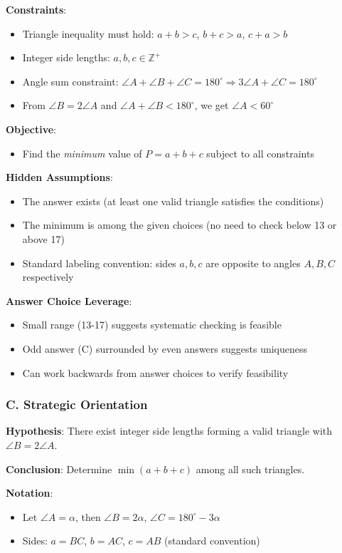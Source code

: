 \documentclass[12pt]{article}
\begin{document}
\begin{problemconfigbox}
\textbf{Constraints}:
\begin{itemize}
    \item Triangle inequality must hold: $a + b > c$, $b + c > a$, $c + a > b$
    \item Integer side lengths: $a, b, c \in \mathbb{Z}^+$
    \item Angle sum constraint: $\angle A + \angle B + \angle C = 180^\circ \Rightarrow 3\angle A + \angle C = 180^\circ$
    \item From $\angle B = 2\angle A$ and $\angle A + \angle B < 180^\circ$, we get $\angle A < 60^\circ$
\end{itemize}

\textbf{Objective}:
\begin{itemize}
    \item Find the \textit{minimum} value of $P = a + b + c$ subject to all constraints
\end{itemize}

\textbf{Hidden Assumptions}:
\begin{itemize}
    \item The answer exists (at least one valid triangle satisfies the conditions)
    \item The minimum is among the given choices (no need to check below 13 or above 17)
    \item Standard labeling convention: sides $a, b, c$ are opposite to angles $A, B, C$ respectively
\end{itemize}

\textbf{Answer Choice Leverage}:
\begin{itemize}
    \item Small range (13-17) suggests systematic checking is feasible
    \item Odd answer (C) surrounded by even answers suggests uniqueness
    \item Can work backwards from answer choices to verify feasibility
\end{itemize}

\subsubsection*{C. Strategic Orientation}

\textbf{Hypothesis}: There exist integer side lengths forming a valid triangle with $\angle B = 2\angle A$.

\textbf{Conclusion}: Determine $\min(a + b + c)$ among all such triangles.

\textbf{Notation}:
\begin{itemize}
    \item Let $\angle A = \alpha$, then $\angle B = 2\alpha$, $\angle C = 180^\circ - 3\alpha$
    \item Sides: $a = BC$, $b = AC$, $c = AB$ (standard convention)
\end{itemize}


\end{problemconfigbox}
\end{document}
